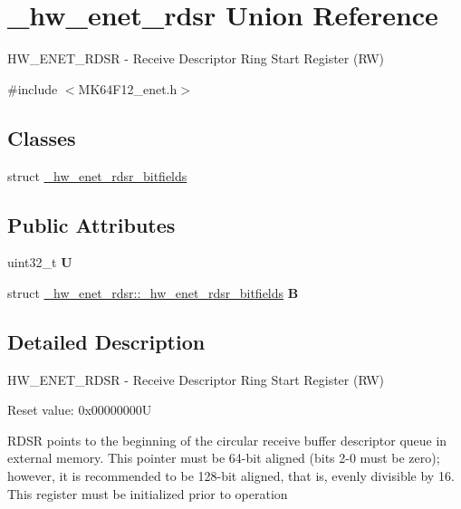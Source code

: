 \hypertarget{union__hw__enet__rdsr}{}\section{\+\_\+hw\+\_\+enet\+\_\+rdsr Union Reference}
\label{union__hw__enet__rdsr}


H\+W\+\_\+\+E\+N\+E\+T\+\_\+\+R\+D\+SR -\/ Receive Descriptor Ring Start Register (RW)  




{\ttfamily \#include $<$M\+K64\+F12\+\_\+enet.\+h$>$}

\subsection*{Classes}
\begin{DoxyCompactItemize}
\item 
struct \hyperlink{struct__hw__enet__rdsr_1_1__hw__enet__rdsr__bitfields}{\+\_\+hw\+\_\+enet\+\_\+rdsr\+\_\+bitfields}
\end{DoxyCompactItemize}
\subsection*{Public Attributes}
\begin{DoxyCompactItemize}
\item 
uint32\+\_\+t {\bfseries U}\hypertarget{union__hw__enet__rdsr_abfdffc1974efaa94b87043382bc6e507}{}\label{union__hw__enet__rdsr_abfdffc1974efaa94b87043382bc6e507}

\item 
struct \hyperlink{struct__hw__enet__rdsr_1_1__hw__enet__rdsr__bitfields}{\+\_\+hw\+\_\+enet\+\_\+rdsr\+::\+\_\+hw\+\_\+enet\+\_\+rdsr\+\_\+bitfields} {\bfseries B}\hypertarget{union__hw__enet__rdsr_a0177abce9e3b90e3b720b630c33ad5d7}{}\label{union__hw__enet__rdsr_a0177abce9e3b90e3b720b630c33ad5d7}

\end{DoxyCompactItemize}


\subsection{Detailed Description}
H\+W\+\_\+\+E\+N\+E\+T\+\_\+\+R\+D\+SR -\/ Receive Descriptor Ring Start Register (RW) 

Reset value\+: 0x00000000U

R\+D\+SR points to the beginning of the circular receive buffer descriptor queue in external memory. This pointer must be 64-\/bit aligned (bits 2-\/0 must be zero); however, it is recommended to be 128-\/bit aligned, that is, evenly divisible by 16. This register must be initialized prior to operation 

